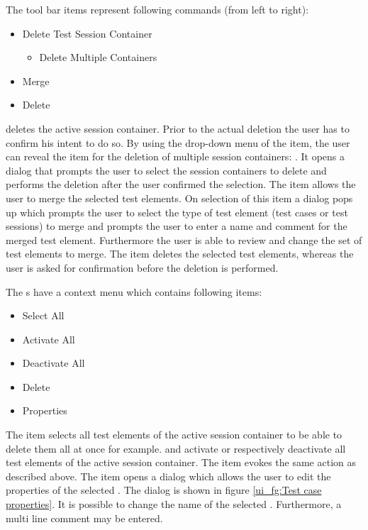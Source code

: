 The tool bar items represent following commands (from left to right):
\begin{itemize}
\item Delete Test Session Container
  \begin{itemize}
  \item Delete Multiple Containers
  \end{itemize}
\item Merge
\item Delete
\end{itemize}
 deletes the active session container. Prior to the actual deletion the user has to confirm his intent to do so. By using the drop-down menu of the  item, the user can reveal the item for the deletion of multiple session containers: . It opens a dialog that prompts the user to select the session containers to delete and performs the deletion after the user confirmed the selection.  The item  allows the user to merge the selected test elements. On selection of this item a dialog pops up which prompts the user to select the type of test element (test cases or test sessions) to merge and prompts the user to enter a name and comment for the merged test element. Furthermore the user is able to review and change the set of test elements to merge. The  item deletes the selected test elements, whereas the user is asked for confirmation before the deletion is performed.
\par
The s have a context menu which contains following items:
\begin{itemize}
\item Select All
\item Activate All
\item Deactivate All
\item Delete
\item Properties
\end{itemize}
The item  selects all test elements of the active session container to be able to delete them all at once for example.  and  activate or respectively deactivate all test elements of the active session container. The item  evokes the same action as described above. The  item opens a dialog which allows the user to edit the properties of the selected . The  dialog is shown in figure \ref{ui_fg:Test case properties}. It is possible to change the name of the selected . Furthermore, a multi line comment may be entered.
